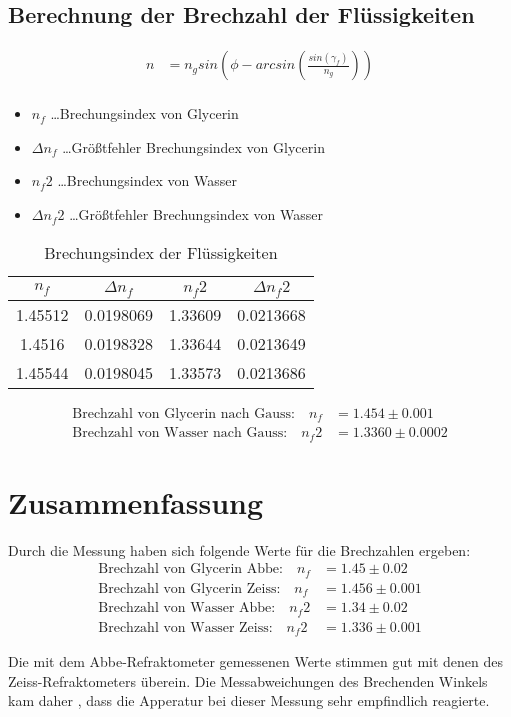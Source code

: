 \documentclass[a4paper]{article}
\begin{document}
\subsection{Berechnung der Brechzahl der Flüssigkeiten}
\begin{align}
  n &=n_g sin\left( \phi - arcsin\left(\frac{sin(\gamma_f)}{n_g}\right)\right)\\
\end{align}
\begin{table}[ht]
				\centering
				\caption{Brechungsindex der Flüssigkeiten}
				\begin{itemize}
								\item $n_f$ \dots Brechungsindex von Glycerin
								\item $\Delta n_f$ \dots Größtfehler Brechungsindex von Glycerin
								\item $n_f2$ \dots  Brechungsindex von Wasser
								\item $\Delta n_f2$ \dots Größtfehler Brechungsindex von Wasser
				\end{itemize}
				\begin{tabular}{|c|c|c|c|}\hline
								$n_f$&$\Delta n_f$&$n_f2$&$\Delta n_f2$\\\hline
				 1.45512 & 0.0198069 & 1.33609 & 0.0213668 \\\hline
				 1.4516 & 0.0198328 & 1.33644 & 0.0213649 \\\hline
				 1.45544 & 0.0198045 & 1.33573 & 0.0213686 \\\hline
				\end{tabular}
				\label{tab:flue}
\end{table}
\begin{align}
				\text{Brechzahl von Glycerin nach Gauss:}\quad n_f&=1.454\pm0.001\\
				\text{Brechzahl von Wasser nach Gauss:}\quad n_f2&=1.3360 \pm 0.0002	
\end{align}

\section{Zusammenfassung}
Durch die Messung haben sich folgende Werte für die Brechzahlen ergeben:
\begin{align}
				\text{Brechzahl von Glycerin Abbe:}\quad n_f&=1.45\pm0.02\\
				\text{Brechzahl von Glycerin Zeiss:}\quad n_f&=1.456\pm0.001\\
				\text{Brechzahl von Wasser Abbe:}\quad n_f2&=1.34 \pm 0.02	\\
				\text{Brechzahl von Wasser Zeiss:}\quad n_f2&=1.336 \pm 0.001	
\end{align}

Die mit dem Abbe-Refraktometer gemessenen Werte stimmen gut mit denen des Zeiss-Refraktometers überein. Die Messabweichungen des Brechenden Winkels kam daher , dass die Apperatur bei dieser Messung sehr empfindlich reagierte.
\end{document}
